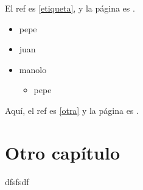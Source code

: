 \documentclass[a4paper,11pt]{memoir}
\begin{document}
El ref es \ref{etiqueta}, y la página es \pageref{etiqueta}.


\begin{itemize}
  \item pepe
  \item juan
  \item manolo
  \begin{itemize}
    \item pepe
  \end{itemize}
\end{itemize}


Aquí, el ref es \ref{otra} y la página es \pageref{otra}.

\chapter{Otro capítulo}

dfsfsdf
\end{document}

